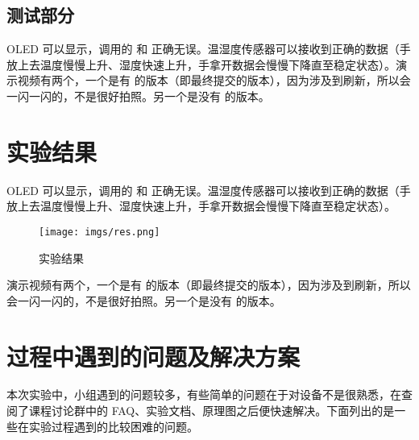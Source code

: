 \subsection{测试部分}

OLED 可以显示，调用的  和  正确无误。温湿度传感器可以接收到正确的数据（手放上去温度慢慢上升、湿度快速上升，手拿开数据会慢慢下降直至稳定状态）。演示视频有两个，一个是有  的版本（即最终提交的版本），因为涉及到刷新，所以会一闪一闪的，不是很好拍照。另一个是没有  的版本。

\section{实验结果}

OLED 可以显示，调用的  和  正确无误。温湿度传感器可以接收到正确的数据（手放上去温度慢慢上升、湿度快速上升，手拿开数据会慢慢下降直至稳定状态）。

\begin{figure}[h!]
    \centering
    \texttt{[image: imgs/res.png]}
    \caption{实验结果}
\end{figure}

演示视频有两个，一个是有  的版本（即最终提交的版本），因为涉及到刷新，所以会一闪一闪的，不是很好拍照。另一个是没有  的版本。

\newpage

\section{过程中遇到的问题及解决方案}

本次实验中，小组遇到的问题较多，有些简单的问题在于对设备不是很熟悉，在查阅了课程讨论群中的 FAQ、实验文档、原理图之后便快速解决。下面列出的是一些在实验过程遇到的比较困难的问题。

